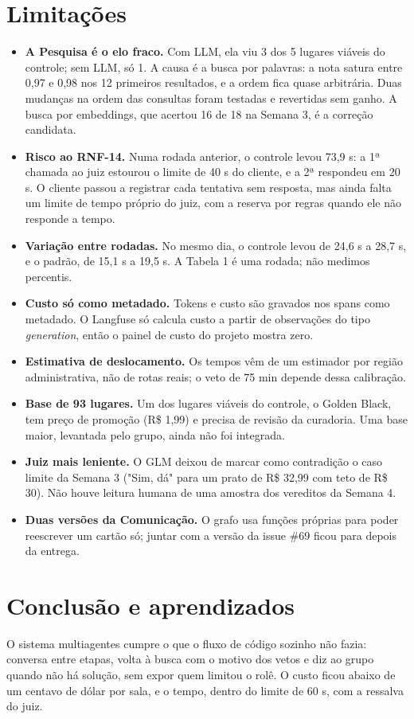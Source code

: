 \documentclass[12pt,a4paper]{article}
\begin{document}
\section{Limitações}
\begin{itemize}
\item \textbf{A Pesquisa é o elo fraco.} Com LLM, ela viu 3 dos 5 lugares viáveis do controle; sem LLM, só 1. A causa é a busca por palavras: a nota satura entre 0,97 e 0,98 nos 12 primeiros resultados, e a ordem fica quase arbitrária. Duas mudanças na ordem das consultas foram testadas e revertidas sem ganho. A busca por embeddings, que acertou 16 de 18 na Semana 3, é a correção candidata.
\item \textbf{Risco ao RNF-14.} Numa rodada anterior, o controle levou 73,9 s: a 1ª chamada ao juiz estourou o limite de 40 s do cliente, e a 2ª respondeu em 20 s. O cliente passou a registrar cada tentativa sem resposta, mas ainda falta um limite de tempo próprio do juiz, com a reserva por regras quando ele não responde a tempo.
\item \textbf{Variação entre rodadas.} No mesmo dia, o controle levou de 24,6 s a 28,7 s, e o padrão, de 15,1 s a 19,5 s. A Tabela 1 é uma rodada; não medimos percentis.
\item \textbf{Custo só como metadado.} Tokens e custo são gravados nos spans como metadado. O Langfuse só calcula custo a partir de observações do tipo \textit{generation}, então o painel de custo do projeto mostra zero.
\item \textbf{Estimativa de deslocamento.} Os tempos vêm de um estimador por região administrativa, não de rotas reais; o veto de 75 min depende dessa calibração.
\item \textbf{Base de 93 lugares.} Um dos lugares viáveis do controle, o Golden Black, tem preço de promoção (R\$ 1,99) e precisa de revisão da curadoria. Uma base maior, levantada pelo grupo, ainda não foi integrada.
\item \textbf{Juiz mais leniente.} O GLM deixou de marcar como contradição o caso limite da Semana 3 ("Sim, dá" para um prato de R\$ 32,99 com teto de R\$ 30). Não houve leitura humana de uma amostra dos vereditos da Semana 4.
\item \textbf{Duas versões da Comunicação.} O grafo usa funções próprias para poder reescrever um cartão só; juntar com a versão da issue \#69 ficou para depois da entrega.
\end{itemize}


\section{Conclusão e aprendizados}
O sistema multiagentes cumpre o que o fluxo de código sozinho não fazia: conversa entre etapas, volta à busca com o motivo dos vetos e diz ao grupo quando não há solução, sem expor quem limitou o rolê. O custo ficou abaixo de um centavo de dólar por sala, e o tempo, dentro do limite de 60 s, com a ressalva do juiz.
\end{document}
